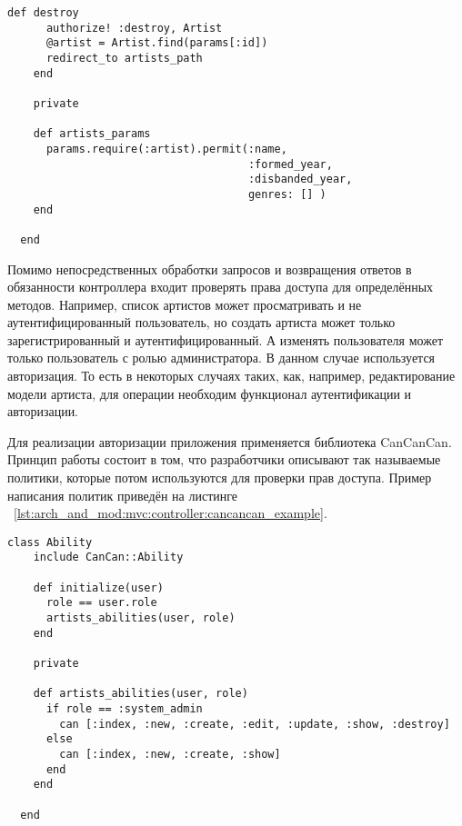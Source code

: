 \begin{lstlisting}[style=fsharpstyle,caption={Пример получения артистов по определённым параметрам}, label=lst:arch_and_mod:mvc:controller:artists_controller_example]
    def destroy
      authorize! :destroy, Artist
      @artist = Artist.find(params[:id])
      redirect_to artists_path
    end

    private

    def artists_params
      params.require(:artist).permit(:name,
                                     :formed_year,
                                     :disbanded_year,
                                     genres: [] )
    end

  end
\end{lstlisting}

Помимо непосредственных обработки запросов и возвращения ответов в обязанности контроллера входит проверять права доступа для определённых методов. Например, список артистов может просматривать и не аутентифицированный пользователь, но создать артиста может только зарегистрированный и аутентифицированный. А изменять пользователя может только пользователь с ролью администратора. В данном случае используется авторизация. То есть в некоторых случаях таких, как, например, редактирование модели артиста, для операции необходим функционал аутентификации и авторизации.

Для реализации авторизации приложения применяется библиотека CanCanCan. Принцип работы состоит в том, что разработчики описывают так называемые политики, которые потом используются для проверки прав доступа. Пример написания политик приведён на листинге ~\ref{lst:arch_and_mod:mvc:controller:cancancan_example}.

\begin{lstlisting}[style=fsharpstyle,caption={Пример получения артистов по определённым параметрам}, label=lst:arch_and_mod:mvc:controller:cancancan_example]
  class Ability
    include CanCan::Ability

    def initialize(user)
      role == user.role
      artists_abilities(user, role)
    end

    private

    def artists_abilities(user, role)
      if role == :system_admin
        can [:index, :new, :create, :edit, :update, :show, :destroy]
      else
        can [:index, :new, :create, :show]
      end
    end

  end

\end{lstlisting}

